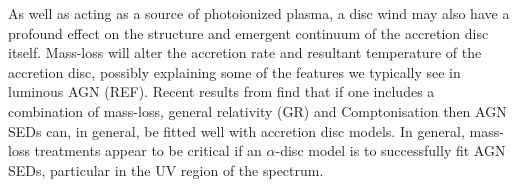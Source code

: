 \documentclass[useAMS,usenatbib]{mn2e_x}
\begin{document}
As well as acting as a source of photoionized plasma, 
a disc wind may also have a profound effect on the structure and 
emergent continuum of the accretion disc itself.
Mass-loss will alter the accretion rate and resultant 
temperature of the accretion disc, possibly explaining some 
of the features we typically see in luminous AGN (REF).
Recent results from \cite{capellupo2015} find 
that if one includes a combination of mass-loss, general relativity (GR) and Comptonisation
then AGN SEDs can, in general, be fitted well with accretion disc models.
In general, mass-loss treatments appear to be critical if an $\alpha$-disc
model is to successfully fit AGN SEDs, particular in the UV region of the spectrum.


\end{document}
